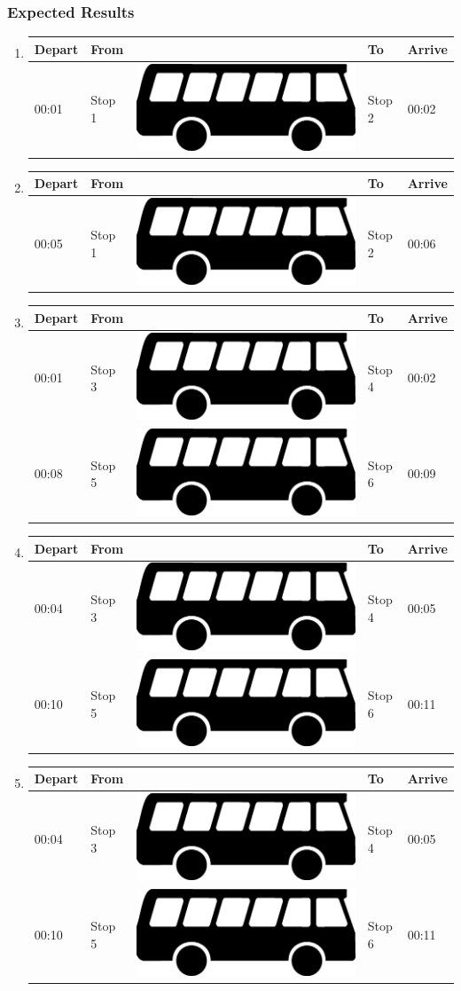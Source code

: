 \documentclass[a4paper,11pt]{article}
\newcommand*{\bus}{\includegraphics[scale=0.02]{img/bus}}
\begin{document}
\begin{enumerate}
\subsubsection*{Expected Results}
\begin{enumerate}
\item
{\scriptsize
\begin{tabular}{p{.75cm} | p{3.0cm} c p{3.0cm} | p{.75cm} }
\hline
\rowcolor{Gray}
Depart & From & & To & Arrive \\
\hline
00:01 & Stop 1 & \bus & Stop 2 & 00:02 \\
\hline
\end{tabular}
}
\item
{\scriptsize
\begin{tabular}{p{.75cm} | p{3.0cm} c p{3.0cm} | p{.75cm} }
\hline
\rowcolor{Gray}
Depart & From & & To & Arrive \\
\hline
00:05 & Stop 1 & \bus & Stop 2 & 00:06 \\
\hline
\end{tabular}
}
\item
{\scriptsize
\begin{tabular}{p{.75cm} | p{3.0cm} c p{3.0cm} | p{.75cm} }
\hline
\rowcolor{Gray}
Depart & From & & To & Arrive \\
\hline
00:01 & Stop 3 & \bus & Stop 4 & 00:02 \\
\hline
00:08 & Stop 5 & \bus & Stop 6 & 00:09 \\
\hline
\end{tabular}
}
\item
{\scriptsize
\begin{tabular}{p{.75cm} | p{3.0cm} c p{3.0cm} | p{.75cm} }
\hline
\rowcolor{Gray}
Depart & From & & To & Arrive \\
\hline
00:04 & Stop 3 & \bus & Stop 4 & 00:05 \\
\hline
00:10 & Stop 5 & \bus & Stop 6 & 00:11 \\
\hline
\end{tabular}
}
\item
{\scriptsize
\begin{tabular}{p{.75cm} | p{3.0cm} c p{3.0cm} | p{.75cm} }
\hline
\rowcolor{Gray}
Depart & From & & To & Arrive \\
\hline
00:04 & Stop 3 & \bus & Stop 4 & 00:05 \\
\hline
00:10 & Stop 5 & \bus & Stop 6 & 00:11 \\
\hline
\end{tabular}
}
\end{enumerate}
\newpage


\end{enumerate}
\end{document}
